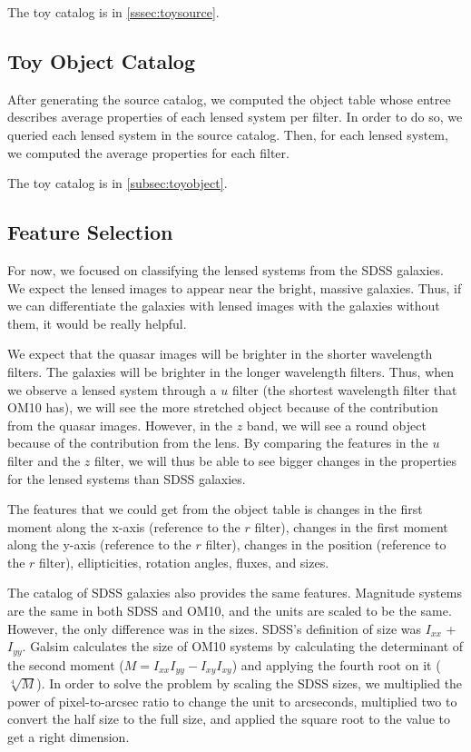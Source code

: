 \documentclass[\docopts]{\docclass}
\begin{document}
The toy catalog is in \autoref{sssec:toysource}.

\subsection{Toy Object Catalog}
\label{sssec:toyobject}

After generating the source catalog, we computed the object table whose
entree describes average properties of each lensed system per filter. In
order to do so, we queried each lensed system in the source catalog.
Then, for each lensed system, we computed the average properties for
each filter.

The toy catalog is in \autoref{subsec:toyobject}.

\subsection{Feature Selection}
\label{subsec:feature}

For now, we focused on classifying the lensed systems from the SDSS
galaxies. We expect the lensed images to appear near the bright, massive
galaxies. Thus, if we can differentiate the galaxies with lensed images
with the galaxies without them, it would be really helpful.

We expect that the quasar images will be brighter in the shorter
wavelength filters. The galaxies will be brighter in the longer
wavelength filters. Thus, when we observe a lensed system through a $u$
filter (the shortest wavelength filter that OM10 has), we will see the
more stretched object because of the contribution from the quasar
images. However, in the $z$ band, we will see a round object because of
the contribution from the lens. By comparing the features in the $u$
filter and the $z$ filter, we will thus be able to see bigger changes in
the properties for the lensed systems than SDSS galaxies.

The features that we could get from the object table is changes in the
first moment along the x-axis (reference to the $r$ filter), changes in
the first moment along the y-axis (reference to the $r$ filter), changes
in the position (reference to the $r$ filter), ellipticities, rotation
angles, fluxes, and sizes.

The catalog of SDSS galaxies also provides the same features. Magnitude
systems are the same in both SDSS and OM10, and the units are scaled to
be the same. However, the only difference was in the sizes. SDSS's
definition of size was $I_{xx}$ + $I_{yy}$. Galsim calculates the size
of OM10 systems by calculating the determinant of the second moment
($M=I_{xx}I_{yy}-I_{xy}I_{xy}$) and applying the fourth root on it
($\sqrt[4]{M}$). In order to solve the problem by scaling the SDSS
sizes, we multiplied the power of pixel-to-arcsec ratio to change the
unit to arcseconds, multiplied two to convert the half size to the full
size, and applied the square root to the value to get a right dimension.
\end{document}

